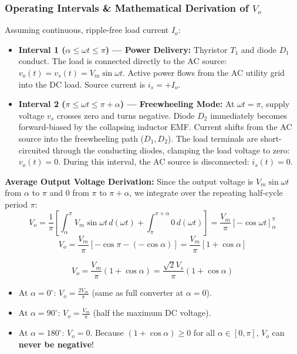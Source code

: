 \documentclass[11pt,a4paper]{article}
\renewcommand{\boxed}[1]{#1}
\begin{document}
\subsubsection{Operating Intervals \& Mathematical Derivation of \texorpdfstring{$V_o$}{Vo}}
Assuming continuous, ripple-free load current $I_o$:
\begin{itemize}[leftmargin=*]
  \item \textbf{Interval 1 ($\alpha \le \omega t \le \pi$) --- Power Delivery:} Thyristor $T_1$ and diode $D_1$ conduct. The load is connected directly to the AC source: $v_o(t) = v_s(t) = V_m \sin\omega t$. Active power flows from the AC utility grid into the DC load. Source current is $i_s = +I_o$.
  \item \textbf{Interval 2 ($\pi \le \omega t \le \pi+\alpha$) --- Freewheeling Mode:} At $\omega t = \pi$, supply voltage $v_s$ crosses zero and turns negative. Diode $D_2$ immediately becomes forward-biased by the collapsing inductor EMF. Current shifts from the AC source into the freewheeling path ($D_1, D_2$). The load terminals are short-circuited through the conducting diodes, clamping the load voltage to zero: $v_o(t) = 0$. During this interval, the AC source is disconnected: $i_s(t) = 0$.
\end{itemize}

\textbf{Average Output Voltage Derivation:}
Since the output voltage is $V_m\sin\omega t$ from $\alpha$ to $\pi$ and $0$ from $\pi$ to $\pi+\alpha$, we integrate over the repeating half-cycle period $\pi$:
\[
V_o = \frac{1}{\pi} \left[ \int_{\alpha}^{\pi} V_m \sin\omega t \, d(\omega t) + \int_{\pi}^{\pi+\alpha} 0 \, d(\omega t) \right] = \frac{V_m}{\pi} [-\cos\omega t]_\alpha^\pi
\]
\[
V_o = \frac{V_m}{\pi} [-\cos\pi - (-\cos\alpha)] = \frac{V_m}{\pi} [1 + \cos\alpha]
\]
\begin{formulabox}
\[
\boxed{V_o = \frac{V_m}{\pi} (1 + \cos\alpha) = \frac{\sqrt{2}V_s}{\pi} (1 + \cos\alpha)}
\]
\begin{itemize}[leftmargin=*]
  \item At $\alpha = 0^\circ$: $V_o = \frac{2 V_m}{\pi}$ (same as full converter at $\alpha = 0$).
  \item At $\alpha = 90^\circ$: $V_o = \frac{V_m}{\pi}$ (half the maximum DC voltage).
  \item At $\alpha = 180^\circ$: $V_o = 0$. Because $(1+\cos\alpha) \ge 0$ for all $\alpha \in [0, \pi]$, $V_o$ can \textbf{never be negative}!
\end{itemize}
\end{formulabox}
\end{document}
